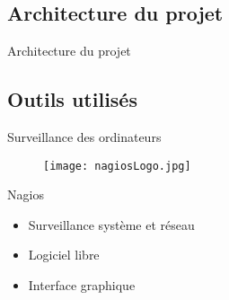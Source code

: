 
\subsection{Architecture du projet}

\begin{frame}{Architecture du projet}
	\begin{figure}[h]
		\centering
			
	\end{figure}
	
\end{frame}


\subsection{Outils utilis\'es}

\begin{frame}{Surveillance des ordinateurs}
	\begin{figure}[h]
		\centering
		\texttt{[image: nagiosLogo.jpg]}
			
	\end{figure}
	
	\begin{block}{Nagios}
		\begin{itemize}
			\item Surveillance syst\`eme et r\'eseau
			\item Logiciel libre
			\item Interface graphique
		
		\end{itemize}

	\end{block}
	
\end{frame}


